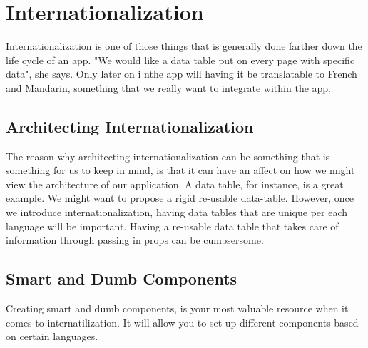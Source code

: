 
\chapter{ Internationalization }

Internationalization is one of those things that is generally done farther down
the life cycle of an app. "We would like a data table put on every page with
specific data", she says. Only later on i nthe app will having it be
translatable to French and Mandarin, something that we really want to integrate
within the app.

\section{ Architecting Internationalization }
The reason why architecting internationalization can be something that is
something for us to keep in mind, is that it can have an affect on how we might
view the architecture of our application. A data table, for instance, is a great
example. We might want to propose a rigid re-usable data-table. However, once
we introduce internationalization, having data tables that are unique per each
language will be important. Having a re-usable data table that takes care of
information through passing in props can be cumbsersome.

\section{ Smart and Dumb Components }
Creating smart and dumb components, is your most valuable resource when it comes
to internatilization. It will allow you to set up different components based on
certain languages. 
